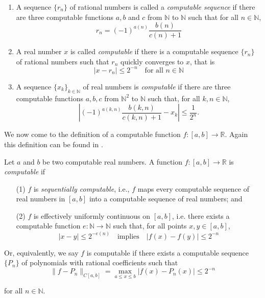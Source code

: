 \documentclass[a4paper,10pt]{article}
\begin{document}
\begin{definition}
\begin{enumerate}
\item  A sequence $\{r_{n}\}$ of rational numbers is called a {\em computable sequence}
if there are three computable functions $a,b$ and $c$ from $\mathbb{N}$ to
$\mathbb{N}$ such that
for all $n\in\mathbb{N}$,
\[ r_{n}=(-1)^{a(n)}\frac{b(n)}{c(n)+1} \]

\item  A real number $x$ is called {\em computable} if there is a computable sequence $\{ r_n\}$ of rational numbers such that $r_n$ quickly converges to $x$, that is
    \[ |x-r_n| \leq 2^{-n} \quad \mbox{for all $n\in {\mathbb N}$} \]

\item  A sequence $\{x_{k}\}_{k\in\mathbb{N}}$ of real numbers is {\em computable}
if there are three computable functions $a,b,c$
from $\mathbb{N}^{2}$ to $\mathbb{N}$ such that, for all
$k,n\in\mathbb{N}$,
\[
\left|  (-1)^{a(k,n)}\frac
{b(k,n)}{c(k,n)+1}-x_{k}\right|  \leq\frac{1}{2^{n}}.
\]
\end{enumerate}
\end{definition}

We now come to the definition of a computable function $f: [a, b]\to {\mathbb R}$. Again this definition can be found in \cite{PR89}.

\begin{definition}
Let $a$ and $b$ be two computable real numbers. A function $f:[a, b]\to {\mathbb R}$ is {\em computable} if
\begin{itemize}
\item[(1)] $f$ is {\em sequentially computable}, i.e., $f$ maps every computable sequence of real numbers in $[a, b]$ into a computable sequence of real numbers; and
\item[(2)] $f$ is effectively uniformly continuous on $[a, b]$, i.e. there exists a computable function $e:{\mathbb N}\to{\mathbb N}$ such that, for all points $x, y\in [a, b]$,
    \[ |x-y|\leq 2^{-e(n)} \quad \mbox{implies} \quad |f(x)-f(y)|\leq 2^{-n} \]
    \end{itemize}
    \end{definition}
    
Or, equivalently, we say $f$ is computable if there exists a computable sequence $\{P_n\}$ of polynomials with rational coefficients such that
\[\|f - P_n\|_{C[a,b]} = \max_{a \leq x \leq b}|f(x) - P_{n}(x)| \leq 2^{-n}\]

for all $n \in \mathbb{N}$.
\end{document}
